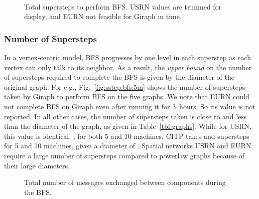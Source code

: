 \documentclass[10pt,conference, compsocconf]{IEEEtran}
\begin{document}
\begin{figure*}[t!]
\centering {}~~~~
\caption{Total supersteps to perform BFS. USRN values are trimmed for display, and EURN not feasible for Giraph in time.}
\label{fig:sstep:bfs}
\vspace{-0.1in}
\end{figure*}

\subsubsection{Number of Supersteps}
In a vertex-centric model, BFS progresses by one level in each superstep as each vertex can only talk to its neighbor. As a result, the \emph{upper bound} on the number of supersteps required to complete the BFS is given by the diameter of the original graph. For e.g., Fig.~\ref{fig:sstep:bfs:5m} shows the number of supersteps taken by Giraph to perform BFS on the five graphs. We note that EURN could not complete BFS on Giraph even after running it for {3~hours}. So its value is not reported. In all other cases, the number of supersteps taken is close to and less than the diameter of the graph, as given in Table~\ref{tbl:graphs}. While for USRN, this value is identical, , for both 5 and 10 machines, CITP takes  and  supersteps for 5 and 10 machines, given a diameter of . Spatial networks USRN and EURN require a large number of supersteps compared to powerlaw graphs because of their large diameters.

\begin{figure*}[!t]
\centering {}
\caption{Total number of messages exchanged between components during the BFS.}
\label{fig:msgs:bfs}
\vspace{-0.1in}
\end{figure*}
\end{document}
